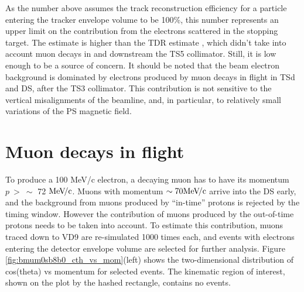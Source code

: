 \documentclass[12pt]{article}
\newcommand {\MeVc}       {\mbox{$\rm MeV\!/c$}}
\begin{document}
As the number above assumes the track reconstruction efficiency for a particle entering
the tracker envelope volume to be 100\%, this number represents an upper limit on
the contribution from the electrons scattered in the stopping target.
The estimate is higher than the TDR estimate \cite{MU2E_6464_CD3_BEAM_ELECTRONS},
which didn't take into account muon decays in and downstream the TS5 collimator.
Still, it is low enough to be a source of concern.
It should be noted that the beam electron background is dominated by electrons
produced by muon decays in flight in TSd and DS, after the TS3 collimator.
This contribution is not sensitive to the vertical misalignments of the beamline, 
and, in particular, to relatively small variations of the PS magnetic field.

\section {Muon decays in flight}

To produce a 100 MeV/c electron, a decaying muon has to have its momentum $p ~>~ \sim$ 72 \MeVc.
Muons with momentum $\sim 70 \MeVc$ arrive into the DS early, and the background
from muons produced by ``in-time'' protons is rejected by the timing window.
However the contribution of muons produced by the out-of-time protons needs
to be taken into account.
%
To estimate this contribution, muons traced down to VD9 are re-simulated 1000 times each,
and events with electrons entering the detector envelope volume are selected for further analysis.
%
Figure \ref{fig:bmum0sb8b0_cth_vs_mom}(left) shows the two-dimensional distribution 
of cos(theta) vs momentum for selected events.
The kinematic region of interest, shown on the plot by the hashed rectangle,
contains no events.
\end{document}
